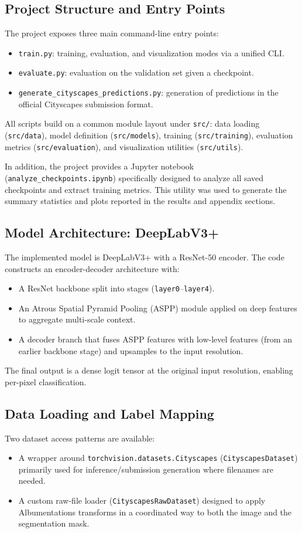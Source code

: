 \documentclass[conference]{IEEEtran}
\begin{document}
\subsection{Project Structure and Entry Points}
The project exposes three main command-line entry points:
\begin{itemize}
\item \texttt{train.py}: training, evaluation, and visualization modes via a unified CLI.
\item \texttt{evaluate.py}: evaluation on the validation set given a checkpoint.
\item \texttt{generate\_cityscapes\_predictions.py}: generation of predictions in the official Cityscapes submission format.
\end{itemize}
All scripts build on a common module layout under \texttt{src/}: data loading (\texttt{src/data}), model definition (\texttt{src/models}), training (\texttt{src/training}), evaluation metrics (\texttt{src/evaluation}), and visualization utilities (\texttt{src/utils}).

In addition, the project provides a Jupyter notebook (\texttt{analyze\_checkpoints.ipynb}) specifically designed to analyze all saved checkpoints and extract training metrics. This utility was used to generate the summary statistics and plots reported in the results and appendix sections.

\subsection{Model Architecture: DeepLabV3+}
The implemented model is DeepLabV3+ with a ResNet-50 encoder. The code constructs an encoder-decoder architecture with:
\begin{itemize}
\item A ResNet backbone split into stages (\texttt{layer0}--\texttt{layer4}).
\item An Atrous Spatial Pyramid Pooling (ASPP) module applied on deep features to aggregate multi-scale context.
\item A decoder branch that fuses ASPP features with low-level features (from an earlier backbone stage) and upsamples to the input resolution.
\end{itemize}
The final output is a dense logit tensor at the original input resolution, enabling per-pixel classification.

\subsection{Data Loading and Label Mapping}
Two dataset access patterns are available:
\begin{itemize}
\item A wrapper around \texttt{torchvision.datasets.Cityscapes} (\texttt{CityscapesDataset}) primarily used for inference/submission generation where filenames are needed.
\item A custom raw-file loader (\texttt{CityscapesRawDataset}) designed to apply Albumentations transforms in a coordinated way to both the image and the segmentation mask.
\end{itemize}
\end{document}
